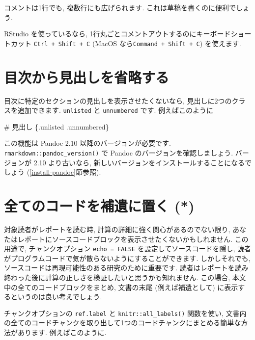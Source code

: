 \documentclass[
  11pt,
  lualatex,
  ja=standard]{bxjsreport}
\newenvironment{Shaded}{\begin{snugshade}}{\end{snugshade}}
\newcommand{\FunctionTok}[1]{\textcolor[rgb]{0.00,0.00,0.00}{#1}}
\begin{document}
コメントは1行でも, 複数行にも広げられます. これは草稿を書くのに便利でしょう.

RStudio を使っているなら, 1行丸ごとコメントアウトするのにキーボードショートカット \texttt{Ctrl + Shift + C} (MacOS なら\texttt{Command + Shift + C}) を使えます.

\hypertarget{toc-unlisted}{%
\section{目次から見出しを省略する}\label{toc-unlisted}}

目次に特定のセクションの見出しを表示させたくないなら, 見出しに2つのクラスを追加できます. \texttt{unlisted} と \texttt{unnumbered} です. 例えばこのように

\begin{Shaded}
\begin{Highlighting}[]
\FunctionTok{\# 見出し \{.unlisted .unnumbered\}}
\end{Highlighting}
\end{Shaded}

この機能は Pandoc 2.10 以降のバージョンが必要です. \texttt{rmarkdown::pandoc\_version()} で Pandoc のバージョンを確認しましょう. バージョンが 2.10 より古いなら, 新しいバージョンをインストールすることになるでしょう (\ref{install-pandoc}節参照).

\hypertarget{code-appendix}{%
\section{全てのコードを補遺に置く (*)}\label{code-appendix}}

対象読者がレポートを読む時, 計算の詳細に強く関心があるのでない限り, あなたはレポートにソースコードブロックを表示させたくないかもしれません. この用途で, チャンクオプション \texttt{echo = FALSE} を設定してソースコードを隠し, 読者がプログラムコードで気が散らないようにすることができます. しかしそれでも, ソースコードは再現可能性のある研究のために重要です. 読者はレポートを読み終わった後に計算の正しさを検証したいと思うかも知れません. この場合, 本文中の全てのコードブロックをまとめ, 文書の末尾 (例えば補遺として) に表示するというのは良い考えでしょう.

チャンクオプションの \texttt{ref.label} と \texttt{knitr::all\_labels()} 関数を使い, 文書内の全てのコードチャンクを取り出して1つのコードチャンクにまとめる簡単な方法があります. 例えばこのように.
\end{document}

